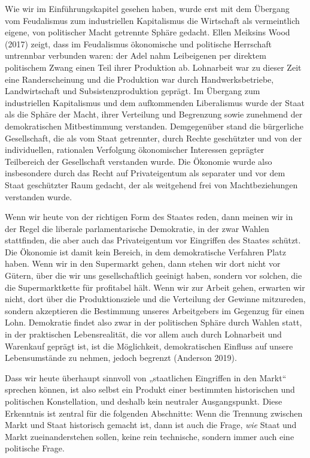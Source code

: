\documentclass[
  nswissgerman,
  a4paper,
  DIV=11,
  numbers=noendperiod,
  oneside,
  openany]{scrreprt}
\begin{document}
Wie wir im Einführungskapitel gesehen haben, wurde erst mit dem Übergang
vom Feudalismus zum industriellen Kapitalismus die Wirtschaft als
vermeintlich eigene, von politischer Macht getrennte Sphäre gedacht.
Ellen Meiksins Wood (2017) zeigt, dass im Feudalismus ökonomische und
politische Herrschaft untrennbar verbunden waren: der Adel nahm
Leibeigenen per direktem politischem Zwang einen Teil ihrer Produktion
ab. Lohnarbeit war zu dieser Zeit eine Randerscheinung und die
Produktion war durch Handwerksbetriebe, Landwirtschaft und
Subsistenzproduktion geprägt. Im Übergang zum industriellen Kapitalismus
und dem aufkommenden Liberalismus wurde der Staat als die Sphäre der
Macht, ihrer Verteilung und Begrenzung sowie zunehmend der
demokratischen Mitbestimmung verstanden. Demgegenüber stand die
bürgerliche Gesellschaft, die als vom Staat getrennter, durch Rechte
geschützter und von der individuellen, rationalen Verfolgung
ökonomischer Interessen geprägter Teilbereich der Gesellschaft
verstanden wurde. Die Ökonomie wurde also insbesondere durch das Recht
auf Privateigentum als separater und vor dem Staat geschützter Raum
gedacht, der als weitgehend frei von Machtbeziehungen verstanden wurde.

Wenn wir heute von der richtigen Form des Staates reden, dann meinen wir
in der Regel die liberale parlamentarische Demokratie, in der zwar
Wahlen stattfinden, die aber auch das Privateigentum vor Eingriffen des
Staates schützt. Die Ökonomie ist damit kein Bereich, in dem
demokratische Verfahren Platz haben. Wenn wir in den Supermarkt gehen,
dann stehen wir dort nicht vor Gütern, über die wir uns gesellschaftlich
geeinigt haben, sondern vor solchen, die die Supermarktkette für
profitabel hält. Wenn wir zur Arbeit gehen, erwarten wir nicht, dort
über die Produktionsziele und die Verteilung der Gewinne mitzureden,
sondern akzeptieren die Bestimmung unseres Arbeitgebers im Gegenzug für
einen Lohn. Demokratie findet also zwar in der politischen Sphäre durch
Wahlen statt, in der praktischen Lebensrealität, die vor allem auch
durch Lohnarbeit und Warenkauf geprägt ist, ist die Möglichkeit,
demokratischen Einfluss auf unsere Lebensumstände zu nehmen, jedoch
begrenzt (Anderson 2019).

Dass wir heute überhaupt sinnvoll von „staatlichen Eingriffen in den
Markt`` sprechen können, ist also selbst ein Produkt einer bestimmten
historischen und politischen Konstellation, und deshalb kein neutraler
Ausgangspunkt. Diese Erkenntnis ist zentral für die folgenden
Abschnitte: Wenn die Trennung zwischen Markt und Staat historisch
gemacht ist, dann ist auch die Frage, \emph{wie} Staat und Markt
zueinanderstehen sollen, keine rein technische, sondern immer auch eine
politische Frage.
\end{document}
